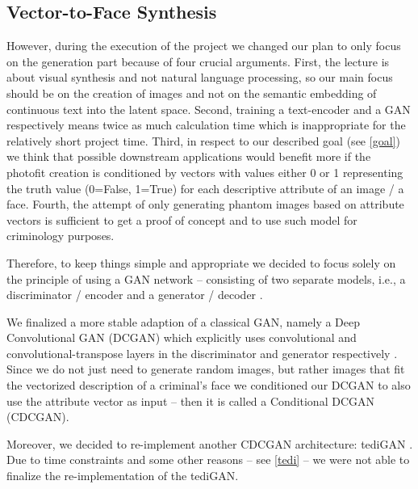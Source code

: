 \documentclass[12pt, a4paper]{article}
\begin{document}
\subsection{Vector-to-Face Synthesis}\label{vec-to-face}
However, during the execution of the project we changed our plan to only focus on the generation part because of four
crucial arguments. First, the lecture is about visual synthesis and not natural language processing, so our main focus
should be on the creation of images and not on the semantic embedding of continuous text into the latent space.
Second, training a text-encoder and a GAN respectively means twice as much calculation time which is inappropriate for
the relatively short project time. Third, in respect to our described goal (see \ref{goal}) we think that possible
downstream applications would benefit more if the photofit creation is conditioned by vectors with values either 0 or 1
representing the truth value (0=False, 1=True) for each descriptive attribute of an image / a face. Fourth, the attempt
of only generating phantom images based on attribute vectors is sufficient to get a proof of concept and to use such 
model for criminology purposes.

Therefore, to keep things simple and appropriate we decided to focus solely on the principle of using a GAN network --
consisting of two separate models, i.e., a discriminator / encoder and a generator / decoder \cite{gan}.

We finalized a more stable adaption of a classical GAN, namely a Deep Convolutional GAN (DCGAN) which explicitly  uses
convolutional and con\-vo\-lu\-tio\-nal-transpose layers in the discriminator and generator respectively \cite{dcgan}.
Since we do not just need to generate random images, but rather images that fit the vectorized description of
a criminal's face we conditioned our DCGAN to also use the attribute vector as input -- then it is called a Conditional
DCGAN (CDCGAN).

Moreover, we decided to re-implement another CDCGAN architecture: tediGAN \cite{Xia_2021_CVPR}.
Due to time constraints and some other reasons -- see \ref{tedi} -- we were not able to finalize the
re-implementation of the tediGAN.
\end{document}
